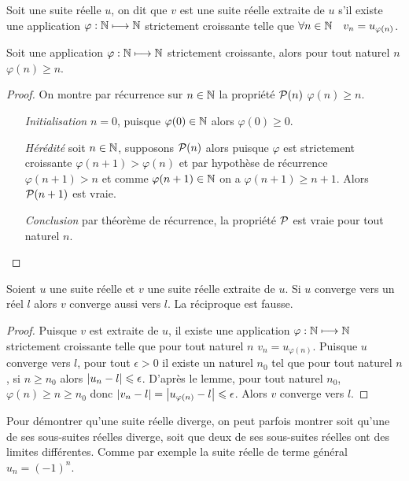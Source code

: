 \begin{defdef}
  Soit une suite réelle \(u\), on dit que \(v\) est une suite réelle extraite de \(u\) s'il existe une application \(\varphi:\N \longmapsto \N\) strictement croissante telle que \(\forall n\in \N \quad v_n=u_{\varphi(n)}\).
\end{defdef}
\begin{lemme}
  Soit une application \(\varphi:\N \longmapsto \N\) strictement croissante, alors pour tout naturel \(n\) \(\varphi(n) \geqslant n\).
\end{lemme}
\begin{proof}
  On montre par récurrence sur \(n \in \N\) la propriété \(\P(n)\) \(\varphi(n) \geqslant n\).
  \begin{itemize}
      \item[\emph{Initialisation}] \(n=0\), puisque \(\varphi(0) \in \N\) alors \(\varphi(0) \geqslant 0\).
      \item[\emph{Hérédité}] soit \(n \in \N\), supposons \(\P(n)\) alors puisque \(\varphi\) est strictement croissante \(\varphi(n+1) > \varphi(n)\) et par hypothèse de récurrence \(\varphi(n+1) > n\) et comme \(\varphi(n+1) \in \N\) on a \(\varphi(n+1) \geqslant n+1\). Alors \(\P(n+1)\) est vraie.
      \item[\emph{Conclusion}] par théorème de récurrence, la propriété \(\P\) est vraie pour tout naturel \(n\).
  \end{itemize}
\end{proof}
\begin{prop}
  Soient \(u\) une suite réelle et \(v\) une suite réelle extraite de \(u\). Si \(u\) converge vers un réel \(l\) alors \(v\) converge aussi vers \(l\). La réciproque est fausse.
\end{prop}
\begin{proof}
  Puisque \(v\) est extraite de \(u\), il existe une application \(\varphi:\N \longmapsto \N\) strictement croissante telle que pour tout naturel \(n\) \(v_n=u_{\varphi(n)}\). Puisque \(u\) converge vers \(l\), pour tout \(\epsilon>0\) il existe un naturel \(n_0\) tel que pour tout naturel \(n\), si \(n \geqslant n_0\) alors \(\abs{u_n-l} \leqslant \epsilon\). D'après le lemme, pour tout naturel \(n_0\), \(\varphi(n) \geqslant n \geqslant n_0\) donc \(\abs{v_n-l}=\abs{u_{\varphi(n)}-l} \leqslant \epsilon\). Alors \(v\) converge vers \(l\).
\end{proof}
Pour démontrer qu'une suite réelle diverge, on peut parfois montrer soit qu'une de ses sous-suites réelles diverge, soit que deux de ses sous-suites réelles ont des limites différentes. Comme par exemple la suite réelle de terme général \(u_n=(-1)^n\).
